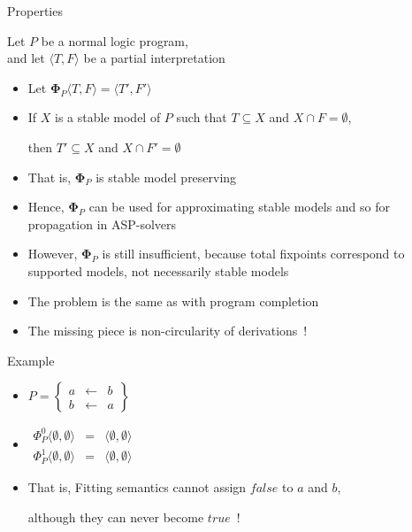 \begin{frame}{Properties}

  Let $P$ be a normal logic program,\\ and
  let $\langle T,F \rangle$ be a partial interpretation

  \begin{itemize}
  \item<1-> Let ${\mathbf{\Phi}}_P\langle T,F \rangle=\langle T',F'\rangle$
  \item<2-> If $X$ is a stable model of $P$ such that $T\subseteq X$ and $X\cap F=\emptyset$,
    \par then $T'\subseteq X$ and $X\cap F'=\emptyset$
  \item<3-> [] That is, ${\mathbf{\Phi}}_P$ is \alert{stable model preserving}
  \item<3-> [] Hence, ${\mathbf{\Phi}}_P$ can be used for approximating stable models
    and so for propagation in ASP-solvers
    \medskip
  \item <4-> However, ${\mathbf{\Phi}}_P$ is still insufficient, because total fixpoints
    correspond to supported models, not necessarily stable models
  \item<5-> []  The problem is the same as with program completion
  \item<6-> [] The missing piece is non-circularity of derivations~!
  \end{itemize}
\end{frame}
\begin{frame}{Example}
  \bigskip
  \begin{itemize}
  \item<1-> []
    \(
    P
    =
    \left\{
      \begin{array}{lcl}
        a &\leftarrow & b \\
        b &\leftarrow & a
      \end{array}
    \right\}
    \)
    \bigskip
  \item<2-> []
    \(
    \begin{array}{lcl}
      \Phi_P^0\langle \emptyset,\emptyset\rangle &=&\langle \emptyset,\emptyset\rangle\\
      \Phi_P^1\langle \emptyset,\emptyset\rangle &=&\langle \emptyset,\emptyset\rangle
    \end{array}
    \)
    \bigskip
  \item<3-> That is, Fitting semantics cannot assign $\mathit{false}$ to $a$ and $b$,

    although they can never become $\mathit{true}$~!
  \end{itemize}
\end{frame}
